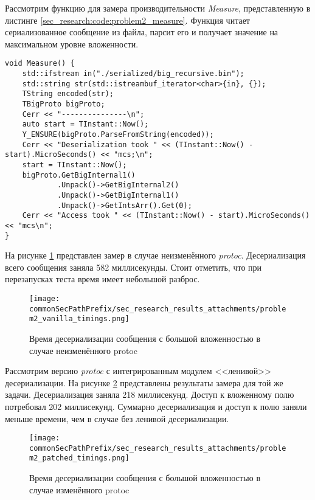 Рассмотрим функцию для замера производительности \textit{Measure}, представленную в листинге \ref{sec_research:code:problem2_measure}.
Функция читает сериализованное сообщение из файла, парсит его и получает значение на максимальном уровне вложенности.

\begin{lstlisting}[style=CodeListing, captionpos=b, caption={Функция Measure}, label=sec_research:code:problem2_measure]
void Measure() {
    std::ifstream in("./serialized/big_recursive.bin");
    std::string str(std::istreambuf_iterator<char>{in}, {});
    TString encoded(str);
    TBigProto bigProto;
    Cerr << "---------------\n";
    auto start = TInstant::Now();
    Y_ENSURE(bigProto.ParseFromString(encoded));
    Cerr << "Deserialization took " << (TInstant::Now() - start).MicroSeconds() << "mcs;\n";
    start = TInstant::Now();
    bigProto.GetBigInternal1()
            .Unpack()->GetBigInternal2()
            .Unpack()->GetBigInternal1()
            .Unpack()->GetIntsArr().Get(0);
    Cerr << "Access took " << (TInstant::Now() - start).MicroSeconds() << "mcs\n";
}
\end{lstlisting}

На рисунке \ref{fig:problem2_vanilla_timings} представлен замер в случае неизменённого \textit{protoc}.
Десериализация всего сообщения заняла 582 миллисекунды. Стоит отметить, что при перезапусках теста время имеет небольшой разброс.

\begin{figure}[H]
    \centering
    \texttt{[image: \\commonSecPathPrefix/sec\_research\_results\_attachments/problem2\_vanilla\_timings.png]}
    \caption{Время десериализации сообщения с большой вложенностью в случае неизменённого protoc}
    \label{fig:problem2_vanilla_timings}
\end{figure}

Рассмотрим версию \textit{protoc} с интегрированным модулем <<ленивой>> десериализации.
На рисунке \ref{fig:problem2_patched_timings} представлены результаты замера для той же задачи. Десериализация заняла 218 миллисекунд. Доступ к вложенному полю потребовал 202 миллисекунд. Суммарно десериализация и доступ к полю заняли меньше времени, чем в случае без ленивой десериализации.

\begin{figure}[H]
    \centering
    \texttt{[image: \\commonSecPathPrefix/sec\_research\_results\_attachments/problem2\_patched\_timings.png]}
    \caption{Время десериализации сообщения с большой вложенностью в случае изменённого protoc}
    \label{fig:problem2_patched_timings}
\end{figure}

